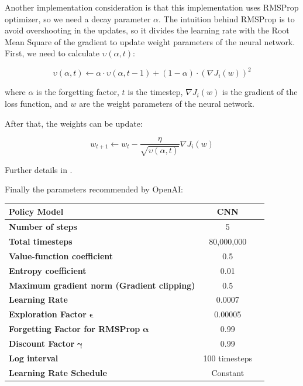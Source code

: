 \documentclass[11pt,twoside,a4paper]{article}
\begin{document}
Another implementation consideration is that this implementation uses RMSProp
optimizer, so we need a decay parameter $ \alpha $. The intuition behind RMSProp
is to avoid overshooting in the updates, so it divides the learning rate with
the Root Mean Square of the gradient to update weight parameters of the neural
network. First, we need to calculate $ \upsilon(\alpha,t) $:

$$
\upsilon(\alpha,t) \leftarrow \alpha \cdot \upsilon(\alpha,t - 1) + (1 - \alpha) \cdot (\nabla J_{i}(w))^{2}
$$

where $ \alpha $ is the forgetting factor, $ t $ is the timestep, $ \nabla J_{i}(w) $
is the gradient of the loss function, and $ w $ are the weight parameters of the
neural network.

After that, the weights can be update:

$$
w_{t + 1} \leftarrow w_{t} - \frac{\eta}{\sqrt{\upsilon(\alpha,t)}}\nabla J_{i}(w)
$$

Further details in \cite{rmsprop}\cite{rmsprop-coursera}.

Finally the parameters recommended by OpenAI:

\begin{center}
  \begin{tabular}{ | l | c | r | }
    \hline
    \textbf{Policy Model} & CNN \\ \hline
    \textbf{Number of steps} & 5 \\ \hline
    \textbf{Total timesteps} & 80,000,000 \\ \hline
    \textbf{Value-function coefficient} & 0.5 \\ \hline
    \textbf{Entropy coefficient} & 0.01 \\ \hline
    \textbf{Maximum gradient norm (Gradient clipping)} & 0.5 \\ \hline
    \textbf{Learning Rate} & 0.0007 \\ \hline
    \textbf{Exploration Factor} $ \boldsymbol{\epsilon} $ & 0.00005 \\ \hline
    \textbf{Forgetting Factor for RMSProp} $ \boldsymbol{\alpha} $ & 0.99 \\ \hline
    \textbf{Discount Factor} $ \boldsymbol{\gamma} $ & 0.99 \\ \hline
    \textbf{Log interval} & 100 timesteps \\ \hline
    \textbf{Learning Rate Schedule} & Constant \\
    \hline
  \end{tabular}
\end{center}
\end{document}
